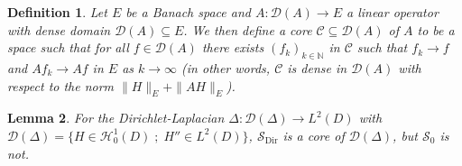 \documentclass[a4paper, reqno, 12pt]{amsart}
\theoremstyle{plain}
\newtheorem{definition}{Definition}[section]
\newtheorem{lemma}[definition]{Lemma}
\theoremstyle{definition}
\newcommand{\N}{\mathbb{N}}
\newcommand{\Sdir}{\mathcal{S}_{\text{Dir}}}
\begin{document}
\begin{definition}
    Let $E$ be a Banach space and $A:\mathcal D(A) \to E$ a linear operator with dense domain $\mathcal D(A)\subseteq E$. We then define a core $\mathcal C\subseteq \mathcal D(A)$ of $A$ to be a space such that for all $f\in \mathcal D(A)$ there exists $(f_k)_{k\in\N}$ in $\mathcal C$ such that $f_k\to f$  and $Af_k \to Af$ in $E$ as $k\to\infty$ (in other words, $\mathcal{C}$ is  dense in $\mathcal D(A)$ with respect to the norm $\|H\|_E +\|AH\|_E$). 
\end{definition}


\begin{lemma} 
\label{lem:Sdircore}
    For the Dirichlet-Laplacian $\Delta: \mathcal D(\Delta) \to L^2(D)$ with $\mathcal D(\Delta) = \{H\in \mathcal H^1_0(D) \; ; \;  H'' \in L^2(D)\}$, $\Sdir$ is a core of $\mathcal{D}(\Delta)$, but $\mathcal S_0$ is not.
\end{lemma}
\end{document}
